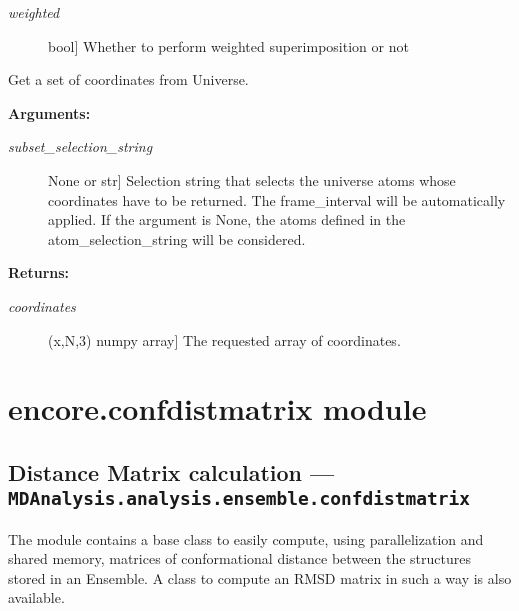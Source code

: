 \documentclass[letterpaper,10pt,english]{sphinxmanual}
\begin{document}
\begin{fulllineitems}
\begin{fulllineitems}
\begin{description}
\item[{\emph{weighted}}] \leavevmode{[}bool{]}
Whether to perform weighted superimposition or not

\end{description}

\end{fulllineitems}


\begin{fulllineitems}
\label{index:encore.Ensemble.Ensemble.get_coordinates}
Get a set of coordinates from Universe.

\textbf{Arguments:}
\begin{description}
\item[{\emph{subset\_selection\_string}}] \leavevmode{[}None or str{]}
Selection string that selects the universe atoms whose coordinates have to be returned. The frame\_interval will be automatically applied.
If the argument is None,  the atoms defined in the atom\_selection\_string will be considered.

\end{description}

\textbf{Returns:}
\begin{description}
\item[{\emph{coordinates}}] \leavevmode{[}(x,N,3) numpy array{]}
The requested array of coordinates.

\end{description}

\end{fulllineitems}


\end{fulllineitems}



\section{encore.confdistmatrix module}
\label{index:encore-confdistmatrix-module}\label{index:module-encore.confdistmatrix}

\subsection{Distance Matrix calculation --- \texttt{MDAnalysis.analysis.ensemble.confdistmatrix}}
\label{index:distance-matrix-calculation-mdanalysis-analysis-ensemble-confdistmatrix}
The module contains a base class to easily compute, using parallelization and shared memory, matrices of conformational distance between the structures stored in an Ensemble.
A class to compute an RMSD matrix in such a way is also available.
\end{document}
